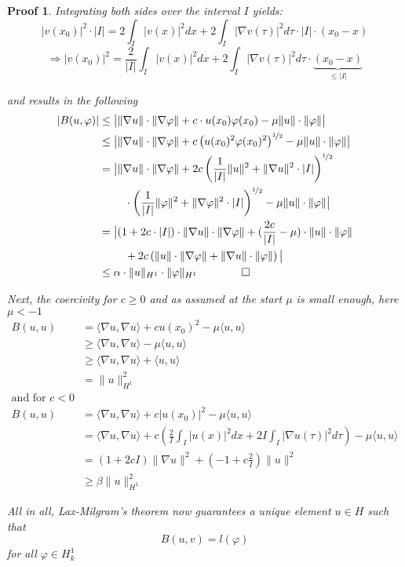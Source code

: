 \documentclass[14pt,a4paper]{scrartcl}
\newtheorem*{proof*}{Proof}
\numberwithin{equation}{section}
\begin{document}
\begin{proof*}
		Integrating both sides over the interval $I$ yields:
			\[	|v(x_{0})|^{2} \cdot |I| = 2 \int_{I} |v(x)|^{2} dx + 2 \int_{I} \left| \nabla  v(\tau) \right|^{2} d\tau \cdot |I| \cdot (x_{0} - x) \]
			\[ \Rightarrow |v(x_{0})|^{2} = \frac{2}{|I|} \int_{I} |v(x)|^{2} dx + 2 \int_{I} \left| \nabla v(\tau) \right|^{2} d\tau \cdot \underbrace{(x_{0} - x)}_{\leq |I|} \] 
	
		and results in the following
		\begin{align*}
			| B(u, \varphi)| & \leq \big| \| \nabla u \| \cdot \| \nabla \varphi \| + c \cdot u(x_{0}) \varphi(x_{0}) - \mu \| u \| \cdot \| \varphi\| \big|	 \\
				& \leq \big| \| \nabla u \| \cdot \| \nabla \varphi \| + c \left( u(x_{0})^{2} \varphi(x_{0})^{2} \right)^{\nicefrac{1}{2}} - \mu \| u \| \cdot \| \varphi\| \big|	\\
				& =  \big| \| \nabla u \| \cdot \| \nabla \varphi \|+ 2 c \left( \frac{1}{|I|} \|u\|^{2} + \| \nabla u \|^{2} \cdot |I| \right)^{\nicefrac{1}{2}} \\
				& ~\qquad \cdot \left( \frac{1}{|I|} \|\varphi \|^{2} + \| \nabla \varphi \|^{2}  \cdot |I| \right)^{\nicefrac{1}{2}} - \mu \| u \| \cdot \| \varphi\| \big| \\
				& = \big| (1 + 2c\cdot|I|) \cdot \| \nabla u \| \cdot \| \nabla \varphi \| + (\frac{2c}{|I|} - \mu) \cdot \| u \| \cdot \| \varphi\| \\
				& ~\qquad + 2c \left( \|u\| \cdot \| \nabla \varphi \| + \| \nabla u \| \cdot \| \varphi \| \right) \big| \\
				& \leq \alpha \cdot \| u \|_{H^{1}} \cdot \| \varphi \|_{H^{1}} 
			\tag*{$\qed$}
		\end{align*}

		Next, the coercivity for $ c \geq 0$ and as assumed at the start $\mu$ is small enough, here $\mu < -1$
		\begin{align*}
			B(u, u) & = \langle \nabla u, \nabla u \rangle + c u(x_{0})^{2} - \mu \langle u , u \rangle \\
				& \geq \langle \nabla u, \nabla u \rangle - \mu \langle u , u \rangle \\
				& \geq \langle \nabla u, \nabla u \rangle  + \langle u , u \rangle \\
				& = \| u \|_{H^{1}}^{2} \\
			\text{and for $c < 0$} \\
			B(u, u) & = \langle \nabla u, \nabla u \rangle + c |u(x_{0})|^{2} - \mu 	\langle u , u \rangle \\
				& = \langle \nabla u, \nabla u \rangle + c \left( \frac{2}{I} \int_{I} |u(x)|^{2} dx + 2 I \int_{I} |\nabla u(\tau)|^{2} d\tau \right) - \mu \langle u , u \rangle  \\
				& = (1 + 2 c I) \| \nabla u \|^{2} + (- 1 + c \frac{2}{I}) \| u \|^{2}  \\
				& \geq \beta \| u \|_{H^{1}}^{2}
			\tag*{$\qed$}
		\end{align*}

		All in all, Lax-Milgram's theorem now guarantees a unique element $u \in H$ such that
			\[ B(u, v) = l(\varphi) \]
		for all $\varphi \in H^{1}_{k}$
	\end{proof*}
	
\end{document}
